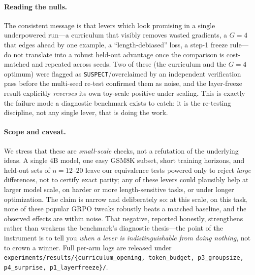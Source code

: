 \documentclass{article}
\begin{document}
\paragraph{Reading the nulls.}
The consistent message is that levers which look promising in a single
underpowered run---a curriculum that visibly removes wasted gradients, a
$G{=}4$ that edges ahead by one example, a ``length-debiased'' loss, a
step-1 freeze rule---do not translate into a robust held-out advantage
once the comparison is cost-matched and repeated across seeds. Two of
these (the curriculum and the $G{=}4$ optimum) were flagged as
\texttt{SUSPECT}/overclaimed by an independent verification pass before
the multi-seed re-test confirmed them as noise, and the layer-freeze
result explicitly \emph{reverses} its own toy-scale positive under
scaling. This is exactly the failure mode a diagnostic benchmark exists
to catch: it is the re-testing discipline, not any single lever, that is
doing the work.

\paragraph{Scope and caveat.}
We stress that these are \emph{small-scale} checks, not a refutation of
the underlying ideas. A single 4B model, one easy GSM8K subset, short
training horizons, and held-out sets of $n{=}12$--$20$ leave our
equivalence tests powered only to reject \emph{large} differences, not
to certify exact parity; any of these levers could plausibly help at
larger model scale, on harder or more length-sensitive tasks, or under
longer optimization. The claim is narrow and deliberately so: at this
scale, on this task, none of these popular GRPO tweaks robustly beats a
matched baseline, and the observed effects are within noise. That
negative, reported honestly, strengthens rather than weakens the
benchmark's diagnostic thesis---the point of the instrument is to tell
you \emph{when a lever is indistinguishable from doing nothing}, not to
crown a winner. Full per-arm logs are released under
\texttt{experiments/results/\{curriculum\_opening, token\_budget,
p3\_groupsize, p4\_surprise, p1\_layerfreeze\}/}.
\end{document}

